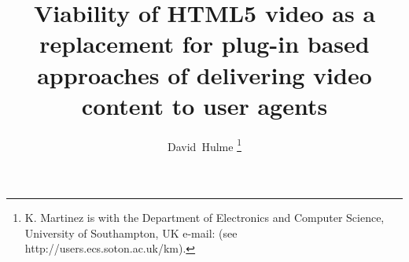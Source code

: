 \documentclass[journal]{IEEEtran}
\begin{document}
\lstset{language=HTML}  

%
\title{Viability of HTML5 video as a replacement for plug-in based approaches of delivering video content to user agents}
%
%
%

\author{David~Hulme%
\thanks{K. Martinez is with the Department
of Electronics and Computer Science, University of Southampton, UK e-mail: (see http://users.ecs.soton.ac.uk/km).}}%

% 
%



% 
\end{document}
